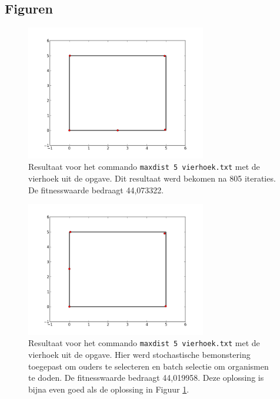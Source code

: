 \documentclass[titlepage,a4paper]{article}
\begin{document}
\newpage
\begin{appendices}
\renewcommand\thefigure{\thesection.\arabic{figure}}
\section{Figuren}
\label{app:figuren}

\setcounter{figure}{0}  

\begin{figure}[H]
\centering
\includegraphics[width=0.7\textwidth]{oplossing_5_vierhoek}
\caption{Resultaat voor het commando \texttt{maxdist 5 vierhoek.txt} met de vierhoek uit de opgave. Dit resultaat werd bekomen na 805 iteraties. De fitnesswaarde bedraagt 44,073322.}
\label{fig:solution_5_vierhoek}
\end{figure}

\begin{figure}[H]
\centering
\includegraphics[width=0.7\textwidth]{oplossing_5_vierhoek_uniform_breed}
\caption{Resultaat voor het commando \texttt{maxdist 5 vierhoek.txt} met de vierhoek uit de opgave. Hier werd stochastische bemonstering toegepast om ouders te selecteren en batch selectie om organismen te doden. De fitnesswaarde bedraagt 44,019958. Deze oplossing is bijna even goed als de oplossing in Figuur \ref{fig:solution_5_vierhoek}.}
\label{fig:solution_5_vierhoek_uniform_breed}
\end{figure}


\end{appendices}
\end{document}
